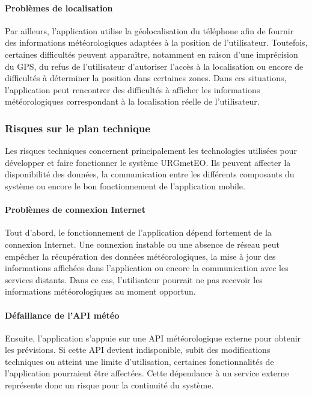 \paragraph{Problèmes de localisation}

Par ailleurs, l’application utilise la géolocalisation du téléphone afin de fournir des informations météorologiques adaptées à la position de l’utilisateur. Toutefois, certaines difficultés peuvent apparaître, notamment en raison d’une imprécision du GPS, du refus de l’utilisateur d’autoriser l’accès à la localisation ou encore de difficultés à déterminer la position dans certaines zones. Dans ces situations, l’application peut rencontrer des difficultés à afficher les informations météorologiques correspondant à la localisation réelle de l’utilisateur.

\subsubsection{Risques sur le plan technique}

Les risques techniques concernent principalement les technologies utilisées pour développer et faire fonctionner le système URGmetEO. Ils peuvent affecter la disponibilité des données, la communication entre les différents composants du système ou encore le bon fonctionnement de l’application mobile.

\paragraph{Problèmes de connexion Internet}

Tout d’abord, le fonctionnement de l’application dépend fortement de la connexion Internet. Une connexion instable ou une absence de réseau peut empêcher la récupération des données météorologiques, la mise à jour des informations affichées dans l’application ou encore la communication avec les services distants. Dans ce cas, l’utilisateur pourrait ne pas recevoir les informations météorologiques au moment opportun.

\paragraph{Défaillance de l’API météo}

Ensuite, l’application s’appuie sur une API météorologique externe pour obtenir les prévisions. Si cette API devient indisponible, subit des modifications techniques ou atteint une limite d’utilisation, certaines fonctionnalités de l’application pourraient être affectées. Cette dépendance à un service externe représente donc un risque pour la continuité du système.

